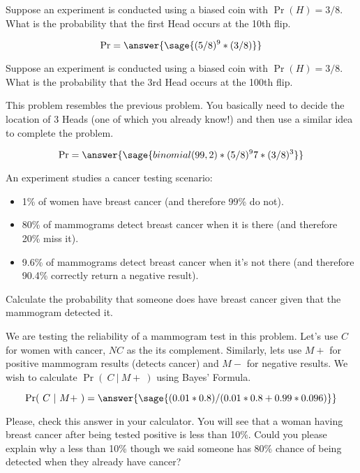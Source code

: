 \documentclass{ximera}
\begin{document}
\begin{problem}
Suppose an experiment is conducted using a biased coin with $\Pr(H)=3/8$. What is the probability that the first Head occurs at the 10th flip.

\begin{prompt}
$$
\Pr=\answer{\sage{(5/8)^9*(3/8)}}
$$
\end{prompt}

\end{problem}

\begin{problem}
Suppose an experiment is conducted using a biased coin with $\Pr(H)=3/8$. What is the probability that the 3rd Head occurs at the 100th flip.
\begin{hint}
This problem resembles the previous problem. You basically need to decide the location of 3 Heads (one of which you already know!) and then use a similar idea to complete the problem.
\end{hint}
\begin{prompt}
$$
\Pr=\answer{\sage{binomial(99,2)*(5/8)^97*(3/8)^3}}
$$
\end{prompt}

\end{problem}

\begin{problem}
An experiment studies a cancer testing scenario:
\begin{itemize}
    \item 1\% of women have breast cancer (and therefore 99\% do not).
    \item 80\% of mammograms detect breast cancer when it is there (and therefore 20\% miss it).
    \item 9.6\% of mammograms detect breast cancer when it’s not there (and therefore 90.4\% correctly return a negative result).
\end{itemize}
Calculate the probability that someone does have breast cancer given that the mammogram detected it.

\begin{hint}
We are testing the reliability of a mammogram test in this problem. Let's use $C$ for women with cancer,  $NC$ as the its complement. Similarly, lets use $M+$ for positive mammogram results (detects cancer) and $M-$ for negative results. We wish to calculate $\Pr(~C~|~M+~)$ using Bayes' Formula.
\end{hint}

$$\Pr(~C~|~M+~)
=\answer{\sage{(0.01*0.8)/(0.01*0.8+0.99*0.096)}}
$$

Please, check this answer in your calculator. You will see that a woman having breast cancer after being tested positive is less than 10\%. Could you please explain why a less than 10\% though we said someone has 80\% chance of being detected when they already have cancer?
\begin{freeResponse}

\end{freeResponse}
\end{problem}
\end{document}
